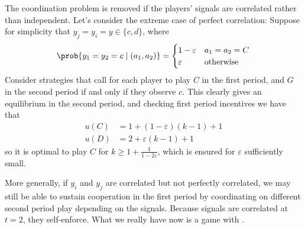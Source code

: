 \documentclass[10pt]{article}
\begin{document}
\begin{example}
	The coordination problem is removed if the players' signals are correlated rather than independent. Let's consider the extreme case of perfect correlation: Suppose for simplicity that $y_j = y_i = y \in \{c,d\}$, where \[\prob\{y_1 = y_2 = c \mid (a_1,a_2)\} = \begin{cases}1-\varepsilon & a_1=a_2=C \\ \varepsilon & \text{otherwise} \end{cases}\]Consider strategies that call for each player to play $C$ in the first period, and $G$ in the second period if and only if they observe $c$. This clearly gives an equilibrium in the second period, and checking first period incentives we have that \begin{align*} u(C) &= 1 + (1-\varepsilon)(k-1) + 1 \\ u(D) &= 2 + \varepsilon(k-1) + 1 \end{align*}so it is optimal to play $C$ for $k \ge 1 + \frac{1}{1-2\varepsilon}$, which is ensured for $\varepsilon$ sufficiently small. 
	
	More generally, if $y_i$ and $y_j$ are correlated but not perfectly correlated, we may still be able to sustain cooperation in the first period by coordinating on different second period play depending on the signals. Because signals are correlated at $t=2$, they self-enforce. What we really have now is a game with .
\end{example}
\end{document}
